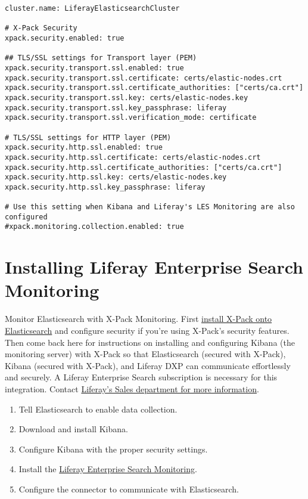 \begin{verbatim}
cluster.name: LiferayElasticsearchCluster

# X-Pack Security
xpack.security.enabled: true

## TLS/SSL settings for Transport layer (PEM)
xpack.security.transport.ssl.enabled: true
xpack.security.transport.ssl.certificate: certs/elastic-nodes.crt
xpack.security.transport.ssl.certificate_authorities: ["certs/ca.crt"]
xpack.security.transport.ssl.key: certs/elastic-nodes.key
xpack.security.transport.ssl.key_passphrase: liferay
xpack.security.transport.ssl.verification_mode: certificate

# TLS/SSL settings for HTTP layer (PEM)
xpack.security.http.ssl.enabled: true
xpack.security.http.ssl.certificate: certs/elastic-nodes.crt
xpack.security.http.ssl.certificate_authorities: ["certs/ca.crt"]
xpack.security.http.ssl.key: certs/elastic-nodes.key
xpack.security.http.ssl.key_passphrase: liferay

# Use this setting when Kibana and Liferay's LES Monitoring are also configured
#xpack.monitoring.collection.enabled: true
\end{verbatim}

\chapter{Installing Liferay Enterprise Search
Monitoring}\label{installing-liferay-enterprise-search-monitoring}

Monitor Elasticsearch with X-Pack Monitoring. First
\href{discover/deployment/-/knowledge_base-7-1/installing-x-pack}{install
X-Pack onto Elasticsearch} and configure security if you're using
X-Pack's security features. Then come back here for instructions on
installing and configuring Kibana (the monitoring server) with X-Pack so
that Elasticsearch (secured with X-Pack), Kibana (secured with X-Pack),
and Liferay DXP can communicate effortlessly and securely. A Liferay
Enterprise Search subscription is necessary for this integration.
Contact
\href{https://www.liferay.com/contact-us\#contact-sales}{Liferay's Sales
department for more information}.

\begin{enumerate}
\def\labelenumi{\arabic{enumi}.}
\item
  Tell Elasticsearch to enable data collection.
\item
  Download and install Kibana.
\item
  Configure Kibana with the proper security settings.
\item
  Install the
  \href{https://web.liferay.com/marketplace/-/mp/application/106163750}{Liferay
  Enterprise Search Monitoring}.
\item
  Configure the connector to communicate with Elasticsearch.
\end{enumerate}

